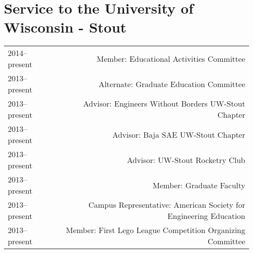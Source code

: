 \section*{Service to the University of Wisconsin - Stout}
\begin{tabular}{L!{\VRule}R}
2014--present&Member: Educational Activities Committee \\
2013--present&Alternate: Graduate Education Committee \\
2013--present&Advisor: Engineers Without Borders UW-Stout Chapter \\
2013--present&Advisor: Baja SAE UW-Stout Chapter \\
2013--present&Advisor: UW-Stout Rocketry Club\\
2013--present&Member: Graduate Faculty \\
2013--present&Campus Representative: American Society for Engineering Education\\
2013--present&Member: First Lego League Competition Organizing Committee\\
\end{tabular}